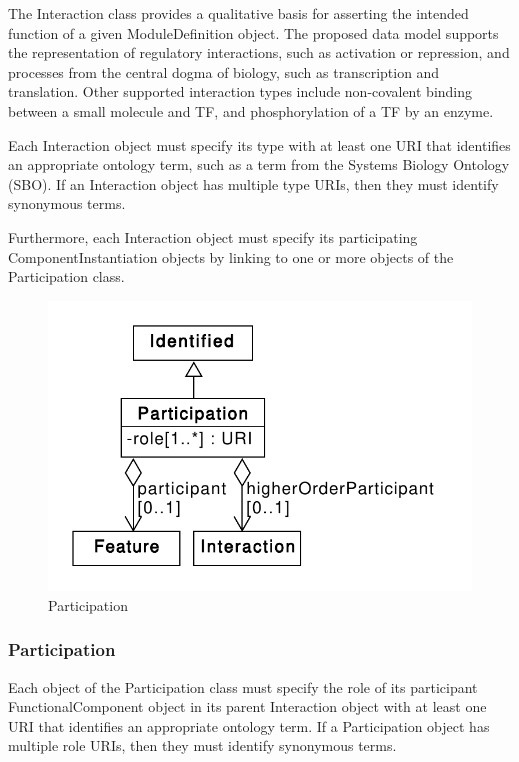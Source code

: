 \documentclass[draftspec]{sbmlpkgspec}
\begin{document}
The Interaction class provides a qualitative basis for asserting the intended function of a given ModuleDefinition object. The proposed data model supports the representation of regulatory interactions, such as activation or repression, and processes from the central dogma of biology, such as transcription and translation. Other supported interaction types include non-covalent binding between a small molecule and TF, and phosphorylation of a TF by an enzyme. 

Each Interaction object must specify its type with at least one URI that identifies an appropriate ontology term, such as a term from the Systems Biology Ontology (SBO). If an Interaction object has multiple type URIs, then they must identify synonymous terms. 

Furthermore, each Interaction object must specify its participating ComponentInstantiation objects by linking to one or more objects of the Participation class.

\begin{figure}[ht]
\begin{center}
\includegraphics[scale=0.6]{uml/participation}
\caption[]{Participation}
\label{uml:participation}
\end{center}
\end{figure}

\subsubsection{Participation}
\label{sec:Participation}
Each object of the Participation class must specify the role of its participant FunctionalComponent object in its parent Interaction object with at least one URI that identifies an appropriate ontology term. If a Participation object has multiple role URIs, then they must identify synonymous terms. 
\end{document}
